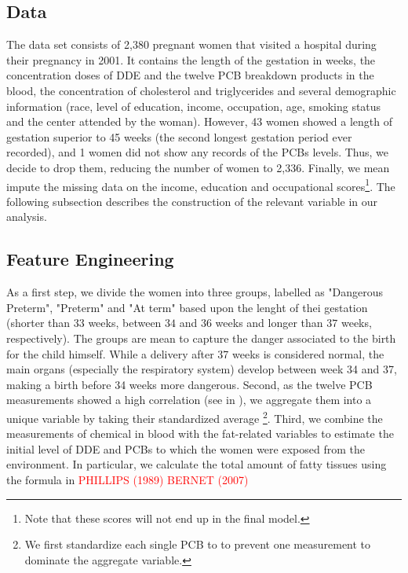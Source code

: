 \documentclass[wcp]{jmlr}%
\newcommand\todo[1]{\textcolor{red}{#1}}
\begin{document}
\subsection{Data}
\label{sec:data}
The data set consists of 2,380 pregnant women that visited a hospital during their pregnancy in 2001. It contains the length of the gestation in weeks, the concentration doses of DDE and the twelve PCB breakdown products in the blood, the concentration of cholesterol and triglycerides and several demographic information (race, level of education, income, occupation, age, smoking status and the center attended by the woman). However, 43 women showed a length of gestation superior to 45 weeks (the second longest gestation period ever recorded), and 1 women did not show any records of the PCBs levels. Thus, we decide to drop them, reducing the number of women to 2,336. Finally, we mean impute the missing data on the income, education and occupational scores\footnote{Note that these scores will not end up in the final model.}. The following subsection describes the construction of the relevant variable in our analysis.

\subsection{Feature Engineering}
\label{sec:feature}
As a first step, we divide the women into three groups, labelled as "Dangerous Preterm", "Preterm" and "At term" based upon the lenght of thei gestation (shorter than $33$ weeks, between $34$ and $36$ weeks and longer than $37$ weeks, respectively). The groups are mean to capture the danger associated to the birth for the child himself. While a delivery after 37 weeks is considered normal, the main organs (especially the respiratory system) develop between week 34 and 37, making a birth before 34 weeks more dangerous. Second, as the twelve PCB measurements showed a high correlation (see  in ), we aggregate them into a unique variable by taking their standardized average \footnote{We first standardize each single PCB to to prevent one measurement to dominate the aggregate variable.}. Third, we combine the measurements of chemical in blood with the fat-related variables to estimate the initial level of DDE and PCBs to which the women were exposed from the environment. In particular, we calculate the total amount of fatty tissues using the formula in \todo{PHILLIPS (1989) BERNET (2007)}
\end{document}
